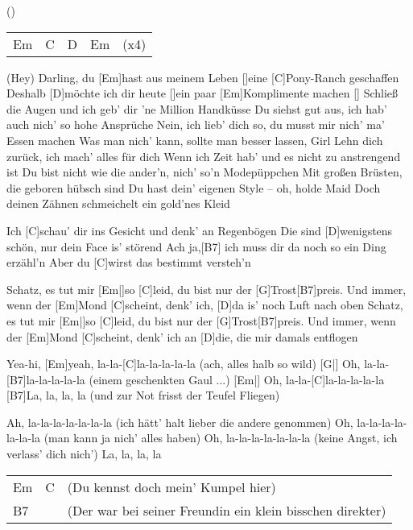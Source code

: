 
 ()



\begin{guitar}
	{\footnotesize\begin{tabular}{l|l|l|l l}
			Em \optionalChord{B} & C & D \optionalChord{G} & Em \optionalChord{D} & (x4)
	\end{tabular}}

	\songsection{Strophe 1}
	(Hey) Darling, du [Em]hast aus meinem Leben []eine [C]Pony-Ranch geschaffen
	Deshalb [D]möchte ich dir heute []ein paar [Em]Komplimente machen []{}
	Schließ die Augen und ich geb' dir 'ne Million Handküsse
	Du siehst gut aus, ich hab' auch nich' so hohe Ansprüche
	Nein, ich lieb' dich so, du musst mir nich' ma' Essen machen
	Was man nich' kann, sollte man besser lassen, Girl
	Lehn dich zurück, ich mach' alles für dich
	Wenn ich Zeit hab' und es nicht zu anstrengend ist
	Du bist nicht wie die ander'n, nich' so'n Modepüppchen
	Mit großen Brüsten, die geboren hübsch sind
	Du hast dein' eigenen Style – oh, holde Maid
	Doch deinen Zähnen schmeichelt ein gold'nes Kleid
	
	Ich [C]schau' dir ins Gesicht und denk' an Regenbögen
	Die sind [D]wenigstens schön, nur dein Face is' störend
	Ach ja,[B7] ich muss dir da noch so ein Ding erzähl'n
	Aber du [C]wirst das bestimmt versteh'n
	
	Schatz, es tut mir [Em|]{so }[C]leid, du bist nur der [G]Trost[B7]preis.
	Und immer, wenn der [Em]Mond [C]scheint, denk' ich, [D]da is' noch Luft nach oben
	Schatz, es tut mir [Em|]{so }[C]leid, du bist nur der [G]Trost[B7]preis.
	Und immer, wenn der [Em]Mond [C]scheint, denk' ich an [D]die, die mir damals entflogen
	
	\pagebreak
	Yea-hi, [Em]yeah, la-la-[C]la-la-la-la-la (ach, alles halb so wild)
	[G|] Oh, la-la-[B7]la-la-la-la-la (einem geschenkten Gaul ...)
	[Em|] Oh, la-la-[C]la-la-la-la-la
	[B7]La, la, la, la (und zur Not frisst der Teufel Fliegen)
	
	Ah, la-la-la-la-la-la-la (ich hätt' halt lieber die andere genommen)
	Oh, la-la-la-la-la-la-la (man kann ja nich' alles haben)
	Oh, la-la-la-la-la-la-la (keine Angst, ich verlass' dich nich')
	La, la, la, la
	{\footnotesize\begin{tabular}{l|l l}
			Em & C & {\small(Du kennst doch mein' Kumpel hier)} \\
			B7 & & {\small(Der war bei seiner Freundin ein klein bisschen direkter)}
	\end{tabular}}
	

\end{guitar}
